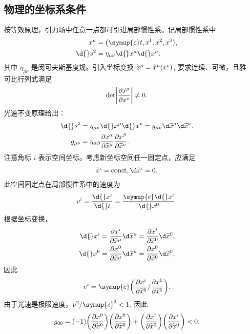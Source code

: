 \documentclass[UTF8, 12pt, a4paper, oneside, onecolumn, fontset=none]{ctexart}
\begin{document}
\subsection{物理的坐标系条件}
按等效原理，引力场中任意一点都可引进局部惯性系。记局部惯性系中
\begin{align}
x^{\mu}&=\mleft(\symup{c}t, x^{1}, x^{2}, x^{3}\mright),\\
\d{}s^{2}&=\eta_{\mu\nu}\d{}x^{\mu}\d{}x^{\nu}.
\end{align}
其中 $\eta_{\mu\nu}$ 是闵可夫斯基度规。引入坐标变换 $\widetilde{x}^{\mu}=\widetilde{x}^{\mu}\mleft(x^{\nu}\mright)$, 要求连续、可微，且雅可比行列式满足
\begin{equation}
\det\mleft\vert\frac{\partial\widetilde{x}^{\mu}}{\partial{}x^{\nu}}\mright\vert\ne0.
\end{equation}
光速不变原理给出：
\begin{align}
\d{}s^{2}&=\eta_{\mu\nu}\d{}x^{\mu}\d{}x^{\nu}=g_{\mu\nu}\d\widetilde{x}^{\mu}\d\widetilde{x}^{\nu}.\\
g_{\mu\nu}&=\eta_{\alpha\beta}\frac{\partial{}x^{\alpha}}{\partial\widetilde{x}^{\mu}}\frac{\partial{}x^{\beta}}{\partial\widetilde{x}^{\nu}}.
\end{align}
注意角标 ${i}$ 表示空间坐标。考虑新坐标空间任一固定点，应满足
\begin{equation}
\widetilde{x}^{i}=\mathrm{const},\d\widetilde{x}^{i}=0.
\end{equation}
此空间固定点在局部惯性系中的速度为
\begin{equation}
v^{i}=\frac{\d{}x^{i}}{\d{}t}=\frac{\symup{c}\d{}x^{i}}{\d{}x^{0}}.
\end{equation}
根据坐标变换，
\begin{align}
\d{}x^{i}=\frac{\partial{}x^{i}}{\partial\widetilde{x}^{\mu}}\d\widetilde{x}^{\mu}=\frac{\partial{}x^{i}}{\partial\widetilde{x}^{0}}\d\widetilde{x}^{0},\\
\d{}x^{0}=\frac{\partial{}x^{0}}{\partial\widetilde{x}^{\mu}}\d\widetilde{x}^{\mu}=\frac{\partial{}x^{0}}{\partial\widetilde{x}^{0}}\d\widetilde{x}^{0},
\end{align}
因此
\begin{equation}
v^{i}=\symup{c}\mleft(\frac{\partial{}x^{i}}{\partial\widetilde{x}^{0}}/\frac{\partial{}x^{0}}{\partial\widetilde{x}^{0}}\mright).
\end{equation}
由于光速是极限速度，$v^{2}/\symup{c}^{2}<1$, 因此
\begin{equation}
g_{00}=\mleft(-1\mright)\mleft(\frac{\partial{}x^{0}}{\partial\widetilde{x}^{0}}\mright)\mleft(\frac{\partial{}x^{0}}{\partial\widetilde{x}^{0}}\mright)+\mleft(\frac{\partial{}x^{i}}{\partial\widetilde{x}^{0}}\mright)\mleft(\frac{\partial{}x^{i}}{\partial\widetilde{x}^{0}}\mright)<0.\label{2.2.11}
\end{equation}
\end{document}
